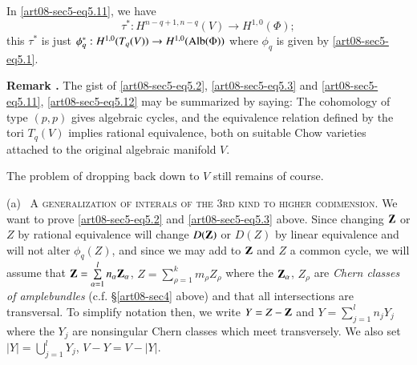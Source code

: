 \begin{remark*}
In \eqref{art08-sec5-eq5.11}, we have
\begin{equation*}
\tau^{*}:H^{n-q+1,n-q}(V)\to H^{1,0}(\Phi);\tag{5.13}\label{art08-sec5-eq5.13}
\end{equation*}
this $\tau^{*}$ is just $\phi^{*}_{q}:H^{1,0}(T_{q}(V))\to H^{1,0}(\operatorname{\mathrm{Alb}}(\Phi))$ where $\phi_{q}$ is given by \eqref{art08-sec5-eq5.1}.
\end{remark*}

\medskip
\noindent
{\bf Remark .\label{art08-sec5-rem5.14}}
The gist of \eqref{art08-sec5-eq5.2}, \eqref{art08-sec5-eq5.3} and \eqref{art08-sec5-eq5.11}, \eqref{art08-sec5-eq5.12} may be summarized by saying: The cohomology of type $(p,p)$ gives algebraic cycles, and the equivalence relation defined by the tori $T_{q}(V)$ implies rational equivalence, both on suitable Chow varieties attached to the original algebraic manifold $V$.
\smallskip

The problem of dropping back down to $V$ still remains of course.

\smallskip
(a)~ \textsc{A generalization of interals of the 3rd kind to higher codimension.} We want to prove \eqref{art08-sec5-eq5.2} and \eqref{art08-sec5-eq5.3} above. Since changing $\mathbf{Z}$ or $Z$ by rational equivalence will change $D(\mathbf{Z})$ or $D(Z)$ by linear equivalence and will not alter $\phi_{q}(Z)$, and since we may add to $\mathbf{Z}$ and $Z$ a common cycle, we will assume that $\mathbf{Z}=\sum\limits^{l}_{\alpha=1}n_{\alpha}\mathbf{Z}_{\alpha}$, $Z=\sum\limits^{k}_{\rho=1}m_{\rho}Z_{\rho}$ where the $\mathbf{Z}_{\alpha}$, $Z_{\rho}$ are {\em Chern classes of ample\pageoriginale bundles} (c.f. \S\ref{art08-sec4} above) and that all intersections are transversal. To simplify notation then, we write $Y=Z-\mathbf{Z}$ and $Y=\sum\limits^{l}_{j=1}n_{j}Y_{j}$ where the $Y_{j}$ are nonsingular Chern classes which meet transversely. We also set $|Y|=\bigcup\limits^{l}_{j=1}Y_{j}$, $V-Y=V-|Y|$.

